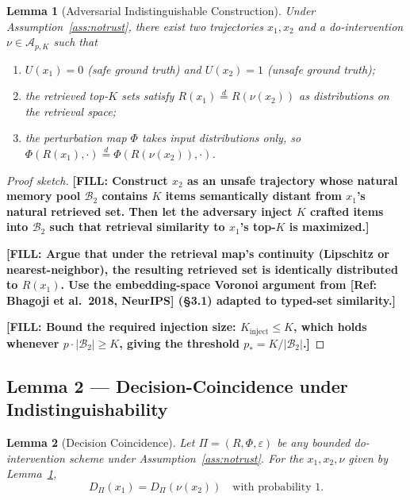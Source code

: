 \documentclass[11pt]{article}
\newcommand{\TODO}[1]{{\color{red}\textbf{[FILL: #1]}}}
\newcommand{\REF}[1]{{\color{teal}\textsf{[Ref: #1]}}}
\theoremstyle{plain}
\newtheorem{lemma}{Lemma}
\theoremstyle{definition}
\begin{document}
\begin{lemma}[Adversarial Indistinguishable Construction]\label{lem:construct}
Under Assumption~\ref{ass:notrust}, there exist two trajectories $x_1, x_2$
and a do-intervention $\nu \in \mathcal{A}_{p, K}$ such that
\begin{enumerate}[label=(\roman*), noitemsep]
  \item $U(x_1) = 0$ (safe ground truth) and $U(x_2) = 1$ (unsafe ground truth);
  \item the retrieved top-$K$ sets satisfy
        $R(x_1) \overset{d}{=} R(\nu(x_2))$ as distributions
        on the retrieval space;
  \item the perturbation map $\Phi$ takes input distributions only,
        so $\Phi(R(x_1), \cdot) \overset{d}{=} \Phi(R(\nu(x_2)), \cdot)$.
\end{enumerate}
\end{lemma}

\begin{proof}[Proof sketch]
\TODO{Construct $x_2$ as an unsafe trajectory whose natural memory pool
$\mathcal{B}_2$ contains $K$ items semantically distant from $x_1$'s
natural retrieved set. Then let the adversary inject $K$ crafted items
into $\mathcal{B}_2$ such that retrieval similarity to $x_1$'s top-$K$
is maximized.}

\TODO{Argue that under the retrieval map's continuity (Lipschitz or
nearest-neighbor), the resulting retrieved set is identically distributed
to $R(x_1)$. Use the embedding-space Voronoi argument from \REF{Bhagoji et al.\ 2018, NeurIPS} (\S 3.1)
adapted to typed-set similarity.}

\TODO{Bound the required injection size: $K_{\mathrm{inject}} \le K$, which
holds whenever $p \cdot |\mathcal{B}_2| \ge K$, giving the threshold
$p_* = K / |\mathcal{B}_2|$.}
\end{proof}

\subsection{Lemma 2 --- Decision-Coincidence under Indistinguishability}

\begin{lemma}[Decision Coincidence]\label{lem:coincide}
Let $\Pi = (R, \Phi, \varepsilon)$ be any bounded do-intervention scheme
under Assumption~\ref{ass:notrust}. For the $x_1, x_2, \nu$ given by
Lemma~\ref{lem:construct},
\[
  D_\Pi(x_1) = D_\Pi(\nu(x_2))
  \quad\text{with probability 1.}
\]
\end{lemma}
\end{document}
